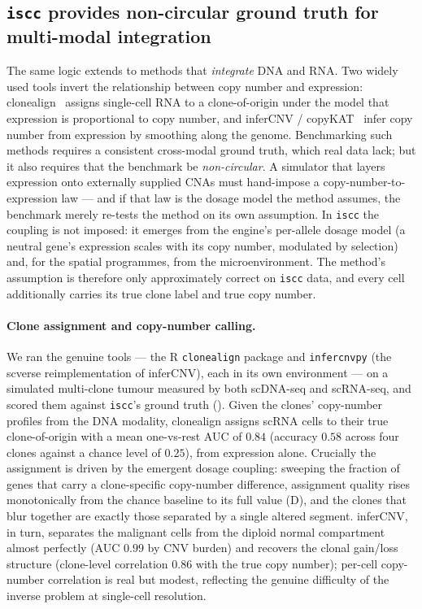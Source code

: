 \documentclass{article}
\begin{document}
\subsection{\texttt{iscc} provides non-circular ground truth for multi-modal integration}
\label{sec:integration}
The same logic extends to methods that \emph{integrate} DNA and RNA. Two widely used tools invert the
relationship between copy number and expression: clonealign~\cite{campbell_clonealign_2019} assigns
single-cell RNA to a clone-of-origin under the model that expression is proportional to copy number,
and inferCNV / copyKAT~\cite{patel_single_2014, gao_copykat_2021} infer copy number from expression by
smoothing along the genome. Benchmarking such methods requires a consistent cross-modal ground truth,
which real data lack; but it also requires that the benchmark be \emph{non-circular}. A simulator that
layers expression onto externally supplied CNAs must hand-impose a copy-number-to-expression law --- and
if that law is the dosage model the method assumes, the benchmark merely re-tests the method on its own
assumption. In \texttt{iscc} the coupling is not imposed: it emerges from the engine's per-allele
dosage model (a neutral gene's expression scales with its copy number, modulated by selection) and, for
the spatial programmes, from the microenvironment. The method's assumption is therefore only
approximately correct on \texttt{iscc} data, and every cell additionally carries its true clone label
and true copy number.

\paragraph{Clone assignment and copy-number calling.}
We ran the genuine tools --- the R \texttt{clonealign} package and \texttt{infercnvpy} (the scverse
reimplementation of inferCNV), each in its own environment --- on a simulated multi-clone tumour
measured by both scDNA-seq and scRNA-seq, and scored them against \texttt{iscc}'s ground truth
(). Given the clones' copy-number profiles from the DNA modality,
clonealign assigns scRNA cells to their true clone-of-origin with a mean one-vs-rest AUC of $0.84$
(accuracy $0.58$ across four clones against a chance level of $0.25$), from expression alone. Crucially
the assignment is driven by the emergent dosage coupling: sweeping the fraction of genes that carry a
clone-specific copy-number difference, assignment quality rises monotonically from the chance baseline
to its full value (D), and the clones that blur together are exactly those
separated by a single altered segment. inferCNV, in turn, separates the malignant cells from the
diploid normal compartment almost perfectly (AUC $0.99$ by CNV burden) and recovers the clonal
gain/loss structure (clone-level correlation $0.86$ with the true copy number); per-cell copy-number
correlation is real but modest, reflecting the genuine difficulty of the inverse problem at single-cell
resolution.
\end{document}
